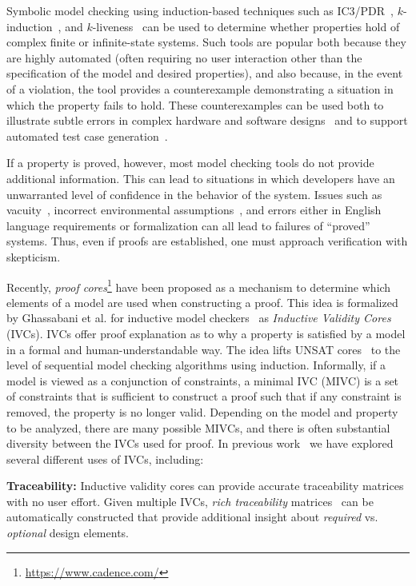 Symbolic model checking using induction-based techniques such as IC3/PDR~\cite{Een2011:PDR}, $k$-induction~\cite{SheeranSS00}, and $k$-liveness~\cite{conf/fmcad/ClaessenS12} can be used to determine whether properties hold of complex finite or infinite-state systems.  Such tools are popular both because they are highly automated (often requiring no user interaction other than the specification of the model and desired properties), and also because, in the event of a violation, the tool provides a counterexample demonstrating a situation in which the property fails to hold.  These counterexamples can be used both to illustrate subtle errors in complex hardware and software designs~\cite{hilt2013,Miller10:CACM} and to support automated test case generation~\cite{Whalen13:OMCDC,You15:dse}.

If a property is proved, however, most model checking tools do not provide additional information.  This can lead to situations in which developers have an unwarranted level of confidence in the behavior of the system.  Issues such as vacuity~\cite{Kupferman03:Vacuity}, incorrect environmental assumptions~\cite{Whalen07:FMICS}, and errors either in English language requirements or formalization
can all lead to failures of ``proved'' systems.  Thus, even if proofs are established, one must approach verification with skepticism.

Recently, {\em proof cores}\footnote{\url{https://www.cadence.com/}} have been proposed as a mechanism to determine which elements of a model are used when constructing a proof.  This idea is formalized by Ghassabani et al. for inductive model checkers~\cite{Ghass16} as {\em Inductive Validity Cores} (IVCs). IVCs offer proof explanation as to why a property is satisfied by a model in a formal and human-understandable way.  The idea lifts UNSAT cores~\cite{zhang2003extracting}
to the level of sequential model checking algorithms using induction.  Informally, if a model is viewed as a conjunction of constraints,
a minimal IVC (MIVC) is a set of constraints that is sufficient to construct a proof such that if any constraint is removed, the property is no longer valid.
%
Depending on the model and property to be analyzed, there are many possible MIVCs, and there is often substantial diversity between the IVCs used for proof.
%
In previous work~\cite{Ghass16,Murugesan16:renext,Ghass17Cov,Ghass17AllIVCs} we have explored several different uses of IVCs, including:

\noindent \textbf{Traceability: } %
Inductive validity cores can provide accurate traceability matrices with no user effort.  Given multiple IVCs, {\em rich traceability} matrices~\cite{Murugesan16:renext} can be automatically constructed that provide additional insight about {\em required} vs. {\em optional} design elements.


